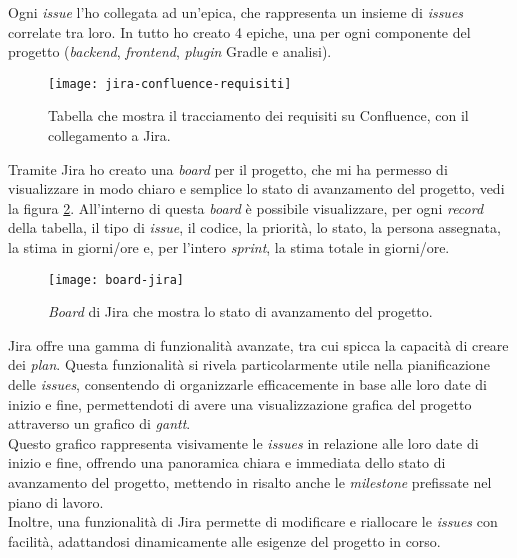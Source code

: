 Ogni \textit{issue} l'ho collegata ad un'epica, che rappresenta un insieme di \textit{issues} correlate tra loro. In tutto ho creato 4 epiche,
una per ogni componente del progetto (\textit{backend}, \textit{frontend}, \textit{plugin} Gradle e analisi).\\
\begin{figure}[!h] 
  \centering 
  \texttt{[image: jira-confluence-requisiti]} 
  \caption{Tabella che mostra il tracciamento dei requisiti su Confluence, con il collegamento a Jira.}
  \label{fig:jira-confluence-requisiti}
\end{figure}

Tramite Jira ho creato una \textit{board} per il progetto, che mi ha permesso di visualizzare in modo chiaro e 
semplice lo stato di avanzamento del progetto, vedi la figura \ref*{fig:board-jira}.
All'interno di questa \textit{board} è possibile visualizzare, per ogni \textit{record} della tabella, il tipo di \textit{issue}, il codice, la priorità, lo stato,
la persona assegnata, la stima in giorni/ore e, per l'intero \textit{sprint}, la stima totale in giorni/ore.\\


\begin{figure}[!h] 
  \centering 
  \texttt{[image: board-jira]} 
  \caption{\textit{Board} di Jira che mostra lo stato di avanzamento del progetto.}
  \label{fig:board-jira}
\end{figure}

\noindent Jira offre una gamma di funzionalità avanzate, tra cui spicca la capacità di creare dei \textit{plan}. 
Questa funzionalità si rivela particolarmente utile nella pianificazione delle \textit{issues}, consentendo di organizzarle 
efficacemente in base alle loro date di inizio e fine, permettendoti di avere una visualizzazione grafica del 
progetto attraverso un grafico di \textit{gantt}. \\ Questo grafico rappresenta visivamente le \textit{issues} 
in relazione alle loro date di inizio e fine, offrendo una panoramica chiara e immediata dello stato di avanzamento del progetto, mettendo
in risalto anche le \textit{milestone} prefissate nel piano di lavoro.\\ 
Inoltre, una funzionalità di Jira permette di modificare e riallocare le \textit{issues} con facilità, 
adattandosi dinamicamente alle esigenze del progetto in corso.
